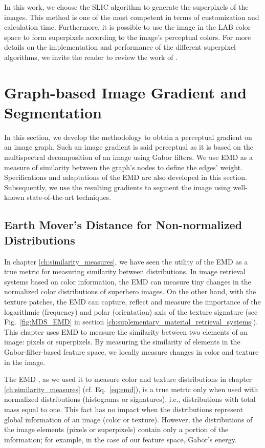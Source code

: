 In this work, we choose the SLIC algorithm to generate the superpixels of the images. This method is one of the most competent in terms of customization and calculation time. Furthermore, it is possible to use the image in the LAB color space to form superpixels according to the image's perceptual colors. For more details on the implementation and performance of the different superpixel algorithms, we invite the reader to review the work of \cite{Wang.Liu.ea:SP:2017}.


\section{Graph-based Image Gradient and Segmentation}

In this section, we develop the methodology to obtain a perceptual gradient on an image graph. Such an image gradient is said perceptual as it is based on the multispectral decomposition of an image using Gabor filters. We use EMD as a measure of similarity between the graph's nodes to define the edges' weight. Specifications and adaptations of the EMD are also developed in this section. Subsequently, we use the resulting gradients to segment the image using well-known state-of-the-art techniques.  

\subsection{Earth Mover's Distance for Non-normalized Distributions}
In chapter \ref{ch:similarity_measures}, we have seen the utility of the EMD as a true metric for measuring similarity between distributions. In image retrieval systems based on color information, the EMD can measure tiny changes in the normalized color distributions of superhero images. On the other hand, with the texture patches, the EMD can capture, reflect and measure the importance of the logarithmic (frequency) and polar (orientation) axis of the texture signature (see Fig.\ \ref{fig:MDS_EMD} in section \ref{ch:suplementary_material_retrieval_systems}). This chapter uses EMD to measure the similarity between two elements of an image: pixels or superpixels. By measuring the similarity of elements in the Gabor-filter-based feature space, we locally measure changes in color and texture in the image. 

The EMD \citep{Rubner.Tomasi.ea:IJCV:2000}, as we used it to measure color and texture distributions in chapter \ref{ch:similarity_measures} (cf. Eq.\ \eqref{eq:emd}), is a true metric only when used with normalized distributions (histograms or signatures), i.e., distributions with total mass equal to one. This fact has no impact when the distributions represent global information of an image (color or texture). However, the distributions of the image elements (pixels or superpixels) contain only a portion of the information; for example, in the case of our feature space, Gabor's energy. 

